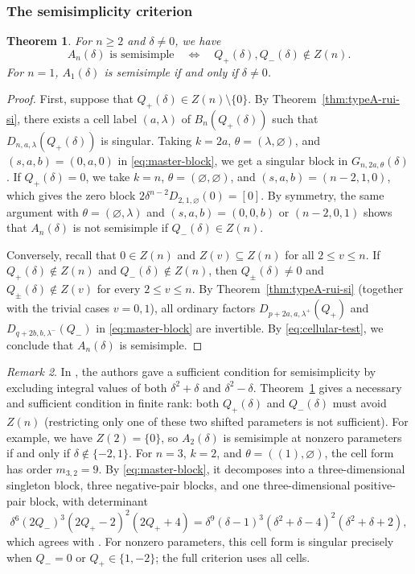 \documentclass[11pt,a4paper]{amsart}
\newtheorem{theorem}{Theorem}[section]
\theoremstyle{uprightdefinition}
\theoremstyle{remark}\newtheorem{remark}[theorem]{Remark}
\begin{document}
\subsubsection{The semisimplicity criterion}
\begin{theorem}\label{thm:C-semisimple}
For $n\ge2$ and $\delta\ne0$, we have
\[
 A_n(\delta)\text{ is semisimple}
 \quad\Longleftrightarrow\quad Q_+(\delta),Q_-(\delta)\notin Z(n).
\]
For $n=1$, $A_1(\delta)$ is semisimple if and only if $\delta\ne0$.
\end{theorem}
\begin{proof}
First, suppose that $Q_+(\delta)\in Z(n)\setminus\{0\}$.
By Theorem~\ref{thm:typeA-rui-si}, there exists a cell label $(a,\lambda)$ of $B_n(Q_+(\delta))$ such that $D_{n,a,\lambda}(Q_+(\delta))$ is singular.
Taking $k=2a$, $\theta=(\lambda,\varnothing)$, and $(s,a,b)=(0,a,0)$
in \eqref{eq:master-block}, we get a singular block in $G_{n,2a,\theta}(\delta)$.
If $Q_+(\delta)=0$, we take $k=n$, $\theta=(\varnothing,\varnothing)$, and
$(s,a,b)=(n-2,1,0)$, which gives the zero block
$2\delta^{n-2}D_{2,1,\varnothing}(0)=[0]$.
By symmetry, the same argument with $\theta=(\varnothing,\lambda)$ and $(s,a,b)=(0,0,b)$ or $(n-2,0,1)$ shows that $A_n(\delta)$ is not semisimple if $Q_-(\delta)\in Z(n)$.

Conversely, recall that $0\in Z(n)$ and $Z(v)\subseteq Z(n)$ for all $2\le v\le n$.
If $Q_+(\delta)\notin Z(n)$ and $Q_-(\delta)\notin Z(n)$, then $Q_\pm(\delta)\ne0$ and $Q_\pm(\delta)\notin Z(v)$ for every $2\le v\le n$. By Theorem~\ref{thm:typeA-rui-si} (together with the trivial cases $v=0,1$), all ordinary factors $D_{p+2a,a,\lambda^+}(Q_+)$ and $D_{q+2b,b,\lambda^-}(Q_-)$ in \eqref{eq:master-block} are invertible.
By \eqref{eq:cellular-test}, we conclude that $A_n(\delta)$ is semisimple.
\end{proof}

\begin{remark}\label{rem:typec2026-example59}
In \cite[Theorem~5.7]{TypeC2026}, the authors gave a sufficient condition for semisimplicity by excluding
integral values of both $\delta^2+\delta$ and $\delta^2-\delta$.
Theorem~\ref{thm:C-semisimple} gives a necessary and sufficient condition in finite rank: both
$Q_+(\delta)$ and $Q_-(\delta)$ must avoid $Z(n)$ (restricting
only one of these two shifted parameters is not sufficient).
For example, we have $Z(2)=\{0\}$, so $A_2(\delta)$ is semisimple at nonzero
parameters if and only if $\delta\notin\{-2,1\}$.
For $n=3$, $k=2$, and $\theta=((1),\varnothing)$, the cell form has order
$m_{3,2}=9$. By \eqref{eq:master-block}, it decomposes into a three-dimensional
singleton block, three negative-pair blocks, and one three-dimensional
positive-pair block, with determinant
\[
 \delta^6(2Q_-)^3(2Q_+-2)^2(2Q_++4)
 =\delta^9(\delta-1)^3(\delta^2+\delta-4)^2
       (\delta^2+\delta+2),
\]
which agrees with \cite[Example~5.9]{TypeC2026}. For nonzero parameters, this cell form is singular precisely when
$Q_-=0$ or $Q_+\in\{1,-2\}$; the full criterion uses all cells.
\end{remark}
\end{document}
